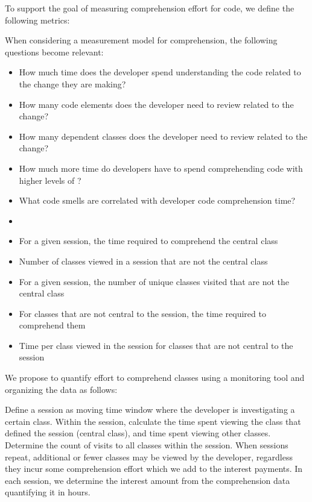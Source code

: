 To support the goal of measuring comprehension effort for code, we define the following metrics:

When considering a measurement model for comprehension, the following questions become relevant:

\begin{itemize}
	\item[] How much time does the developer spend understanding the code related to the change they are making?
	\item[] How many code elements does the developer need to review related to the change?
	\item[] How many dependent classes does the developer need to review related to the change?
	\item[] How much more time do developers have to spend comprehending code with higher levels of \TD?
	\item[] What code smells are correlated with developer code comprehension time?
	\item[] 
\end{itemize}

\begin{itemize}
	\item[] For a given session, the time required to comprehend the central class
	\item[] Number of classes viewed in a session that are not the central class
	\item[] For a given session, the number of unique classes visited that are not the central class
	\item[] For classes that are not central to the session, the time required to comprehend them
	\item[] Time per class viewed in the session for classes that are not central to the session

\end{itemize}


We propose to quantify effort to comprehend classes using a monitoring tool and organizing the data as follows:

Define a session as moving time window where the developer is investigating a certain class.  Within the session, calculate the time spent viewing the class that defined the session (central class), and time spent viewing other classes.  Determine the count of visits to all classes within the session.   When sessions repeat, additional or fewer classes may be viewed by the developer, regardless they incur some comprehension effort which we add to the interest payments.  In each session, we determine the interest amount from the comprehension data quantifying it in hours.  


